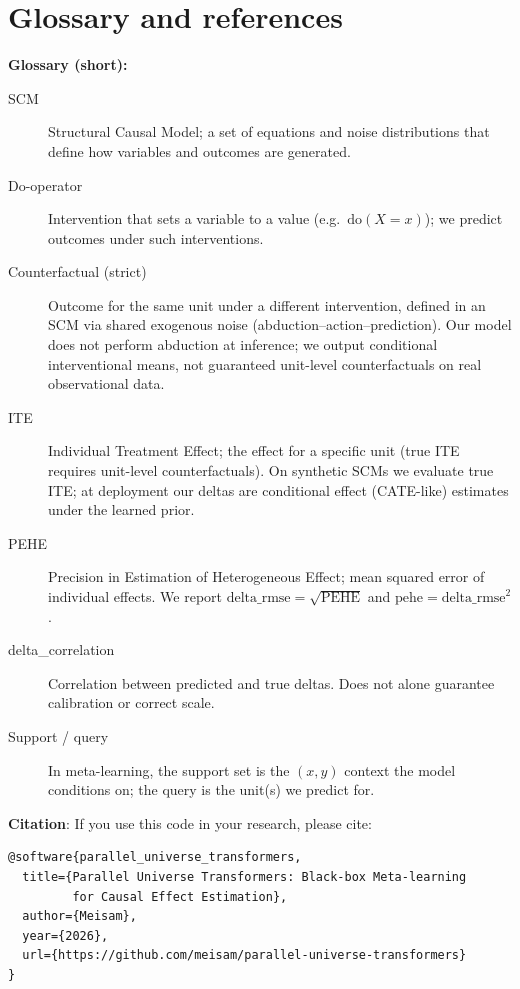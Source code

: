 \documentclass[12pt]{article}
\begin{document}
\section{Glossary and references}

\textbf{Glossary (short):}

\begin{description}
    \item[SCM] Structural Causal Model; a set of equations and noise distributions that define how variables and outcomes are generated.
    \item[Do-operator] Intervention that sets a variable to a value (e.g.\ $\text{do}(X = x)$); we predict outcomes under such interventions.
    \item[Counterfactual (strict)] Outcome for the same unit under a different intervention, defined in an SCM via shared exogenous noise (abduction--action--prediction). Our model does not perform abduction at inference; we output conditional interventional means, not guaranteed unit-level counterfactuals on real observational data.
    \item[ITE] Individual Treatment Effect; the effect for a specific unit (true ITE requires unit-level counterfactuals). On synthetic SCMs we evaluate true ITE; at deployment our deltas are conditional effect (CATE-like) estimates under the learned prior.
    \item[PEHE] Precision in Estimation of Heterogeneous Effect; mean squared error of individual effects. We report $\text{delta\_rmse} = \sqrt{\text{PEHE}}$ and $\text{pehe} = \text{delta\_rmse}^2$.
    \item[delta\_correlation] Correlation between predicted and true deltas. Does not alone guarantee calibration or correct scale.
    \item[Support / query] In meta-learning, the support set is the $(x, y)$ context the model conditions on; the query is the unit(s) we predict for.
\end{description}

\textbf{Citation}: If you use this code in your research, please cite:

\begin{verbatim}
@software{parallel_universe_transformers,
  title={Parallel Universe Transformers: Black-box Meta-learning
         for Causal Effect Estimation},
  author={Meisam},
  year={2026},
  url={https://github.com/meisam/parallel-universe-transformers}
}
\end{verbatim}
\end{document}
